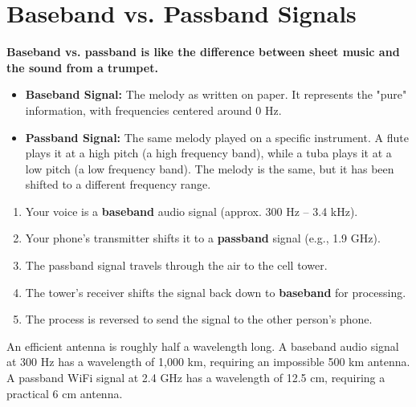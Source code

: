 
\chapter{Baseband vs. Passband Signals}
\label{ch:baseband-passband}

\begin{nontechnical}
    \textbf{Baseband vs. passband is like the difference between sheet music and the sound from a trumpet.}

    \begin{itemize}
        \item \textbf{Baseband Signal:} The melody as written on paper. It represents the "pure" information, with frequencies centered around 0 Hz.
        \item \textbf{Passband Signal:} The same melody played on a specific instrument. A flute plays it at a high pitch (a high frequency band), while a tuba plays it at a low pitch (a low frequency band). The melody is the same, but it has been shifted to a different frequency range.
    \end{itemize}

    \begin{enumerate}[label=\arabic*.]
        \item Your voice is a \textbf{baseband} audio signal (approx. 300 Hz -- 3.4 kHz).
        \item Your phone's transmitter shifts it to a \textbf{passband} signal (e.g., 1.9 GHz).
        \item The passband signal travels through the air to the cell tower.
        \item The tower's receiver shifts the signal back down to \textbf{baseband} for processing.
        \item The process is reversed to send the signal to the other person's phone.
    \end{enumerate}

     An efficient antenna is roughly half a wavelength long. A baseband audio signal at 300 Hz has a wavelength of 1,000 km, requiring an impossible 500 km antenna. A passband WiFi signal at 2.4 GHz has a wavelength of 12.5 cm, requiring a practical 6 cm antenna.
\end{nontechnical}


